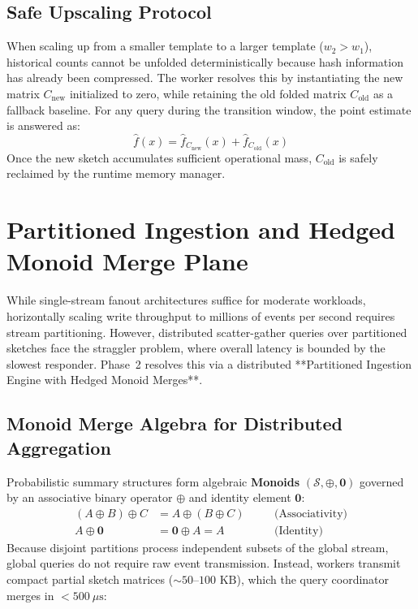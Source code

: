 \subsection{Safe Upscaling Protocol}
When scaling up from a smaller template to a larger template ($w_2 > w_1$), historical counts cannot be unfolded deterministically because hash information has already been compressed. The worker resolves this by instantiating the new matrix $C_{\text{new}}$ initialized to zero, while retaining the old folded matrix $C_{\text{old}}$ as a fallback baseline. For any query during the transition window, the point estimate is answered as:
\begin{equation}
    \hat{f}(x) = \hat{f}_{C_{\text{new}}}(x) + \hat{f}_{C_{\text{old}}}(x)
\end{equation}
Once the new sketch accumulates sufficient operational mass, $C_{\text{old}}$ is safely reclaimed by the runtime memory manager.

\section{Partitioned Ingestion and Hedged Monoid Merge Plane}
\label{sec:hedged_monoid_arch}

While single-stream fanout architectures suffice for moderate workloads, horizontally scaling write throughput to millions of events per second requires stream partitioning. However, distributed scatter-gather queries over partitioned sketches face the straggler problem, where overall latency is bounded by the slowest responder. Phase~2 resolves this via a distributed **Partitioned Ingestion Engine with Hedged Monoid Merges**.

\subsection{Monoid Merge Algebra for Distributed Aggregation}
Probabilistic summary structures form algebraic \textbf{Monoids} $(\mathcal{S}, \oplus, \mathbf{0})$ governed by an associative binary operator $\oplus$ and identity element $\mathbf{0}$:
\begin{align}
    (A \oplus B) \oplus C &= A \oplus (B \oplus C) \quad &&\text{(Associativity)} \\
    A \oplus \mathbf{0} &= \mathbf{0} \oplus A = A \quad &&\text{(Identity)}
\end{align}
Because disjoint partitions process independent subsets of the global stream, global queries do not require raw event transmission. Instead, workers transmit compact partial sketch matrices ($\sim 50\text{--}100\text{ KB}$), which the query coordinator merges in $<500\ \mu\text{s}$:

